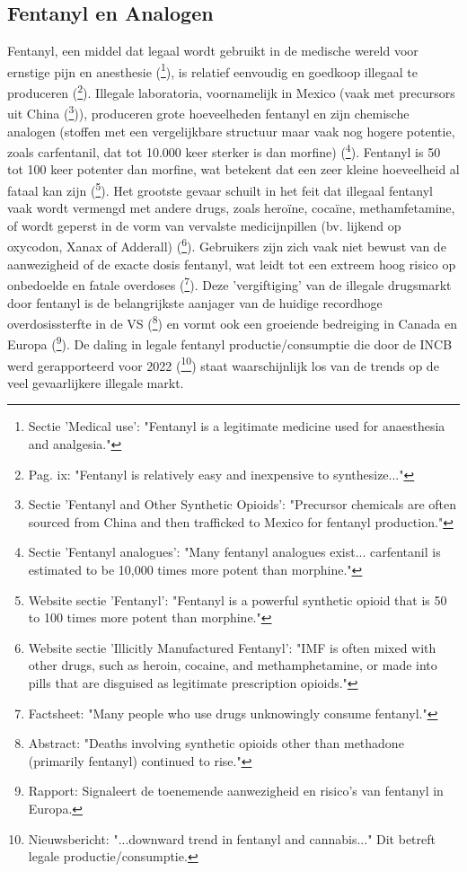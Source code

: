 \documentclass[11pt, a4paper]{report} %
\begin{document}
\subsection{Fentanyl en Analogen}
Fentanyl, een middel dat legaal wordt gebruikt in de medische wereld voor ernstige pijn en anesthesie (\cite{EMCDDAFentanylProfile}\footnote{Sectie 'Medical use': "Fentanyl is a legitimate medicine used for anaesthesia and analgesia."}), is relatief eenvoudig en goedkoop illegaal te produceren (\cite{Pardo2019FutureFentanyl}\footnote{Pag. ix: "Fentanyl is relatively easy and inexpensive to synthesize..."}). Illegale laboratoria, voornamelijk in Mexico (vaak met precursors uit China (\cite{CRS2022OpioidCrisisHistory}\footnote{Sectie 'Fentanyl and Other Synthetic Opioids': "Precursor chemicals are often sourced from China and then trafficked to Mexico for fentanyl production."})), produceren grote hoeveelheden fentanyl en zijn chemische analogen (stoffen met een vergelijkbare structuur maar vaak nog hogere potentie, zoals carfentanil, dat tot 10.000 keer sterker is dan morfine) (\cite{EMCDDAFentanylProfile}\footnote{Sectie 'Fentanyl analogues': "Many fentanyl analogues exist... carfentanil is estimated to be 10,000 times more potent than morphine."}). Fentanyl is 50 tot 100 keer potenter dan morfine, wat betekent dat een zeer kleine hoeveelheid al fataal kan zijn (\cite{ClevelandClinicOpioids}\footnote{Website sectie 'Fentanyl': "Fentanyl is a powerful synthetic opioid that is 50 to 100 times more potent than morphine."}). Het grootste gevaar schuilt in het feit dat illegaal fentanyl vaak wordt vermengd met andere drugs, zoals heroïne, cocaïne, methamfetamine, of wordt geperst in de vorm van vervalste medicijnpillen (bv. lijkend op oxycodon, Xanax of Adderall) (\cite{CDCUnderstandingEpidemic}\footnote{Website sectie 'Illicitly Manufactured Fentanyl': "IMF is often mixed with other drugs, such as heroin, cocaine, and methamphetamine, or made into pills that are disguised as legitimate prescription opioids."}). Gebruikers zijn zich vaak niet bewust van de aanwezigheid of de exacte dosis fentanyl, wat leidt tot een extreem hoog risico op onbedoelde en fatale overdoses (\cite{WHO2023Opioid}\footnote{Factsheet: "Many people who use drugs unknowingly consume fentanyl."}). Deze 'vergiftiging' van de illegale drugsmarkt door fentanyl is de belangrijkste aanjager van de huidige recordhoge overdosissterfte in de VS (\cite{CDC2024DataBrief491}\footnote{Abstract: "Deaths involving synthetic opioids other than methadone (primarily fentanyl) continued to rise."}) en vormt ook een groeiende bedreiging in Canada en Europa (\cite{EMCDDA2024HeroinGlobal}\footnote{Rapport: Signaleert de toenemende aanwezigheid en risico's van fentanyl in Europa.}). De daling in legale fentanyl productie/consumptie die door de INCB werd gerapporteerd voor 2022 (\cite{INCB2024Report}\footnote{Nieuwsbericht: "...downward trend in fentanyl and cannabis..." Dit betreft legale productie/consumptie.}) staat waarschijnlijk los van de trends op de veel gevaarlijkere illegale markt.
\end{document}
